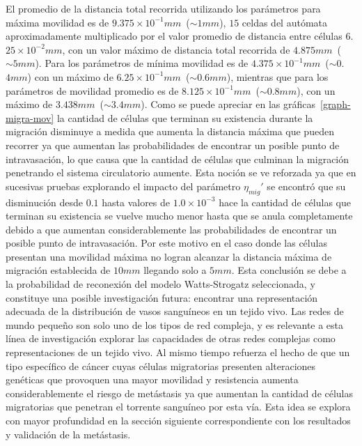 El promedio de la distancia total recorrida utilizando los par\'ametros para m\'axima movilidad es de $9$.$375 \times 10^{-1}mm$~($\sim 1mm$), $15$ celdas del aut\'omata aproximadamente multiplicado por el valor promedio de distancia entre c\'elulas $6$.$25 \times 10^{-2}mm$, con un valor m\'aximo de distancia total recorrida de $4$.$875mm$~($\sim 5mm$). Para los par\'ametros de m\'inima movilidad es de $4$.$375 \times 10^{-1}mm$~($\sim 0$.$4mm$) con un m\'aximo de $6$.$25 \times 10^{-1}mm$~($\sim 0$.$6mm$), mientras que para los par\'ametros de movilidad promedio es de $8$.$125 \times 10^{-1}mm$~($\sim 0$.$8mm$), con un m\'aximo de $3$.$438mm$~($\sim 3$.$4mm$). Como se puede apreciar en las gr\'aficas~\ref{graph-migra-mov} la cantidad de c\'elulas que terminan su existencia durante la migraci\'on disminuye a medida que aumenta la distancia m\'axima que pueden recorrer ya que aumentan las probabilidades de encontrar un posible punto de intravasaci\'on, lo que causa que la cantidad de c\'elulas que culminan la migraci\'on penetrando el sistema circulatorio aumente. Esta noci\'on se ve reforzada ya que en sucesivas pruebas explorando el impacto del par\'ametro $\eta_{mig}'$ se encontr\'o que su disminuci\'on desde $0$.$1$ hasta valores de $1$.$0 \times 10^{-3}$ hace la cantidad de c\'elulas que terminan su existencia se vuelve mucho menor hasta que se anula completamente debido a que aumentan considerablemente las probabilidades de encontrar un posible punto de intravasaci\'on. Por este motivo en el caso donde las c\'elulas presentan una movilidad m\'axima no logran alcanzar la distancia m\'axima de migraci\'on establecida de $10mm$ llegando solo a $5mm$. Esta conclusi\'on se debe a la probabilidad de reconexi\'on del modelo Watts-Strogatz seleccionada, y constituye una posible investigaci\'on futura: encontrar una representaci\'on adecuada de la distribuci\'on de vasos sangu\'ineos en un tejido vivo. Las redes de mundo peque\~no son solo uno de los tipos de red compleja, y es relevante a esta l\'inea de investigaci\'on explorar las capacidades de otras redes complejas como representaciones de un tejido vivo. Al mismo tiempo refuerza el hecho de que un tipo espec\'ifico de c\'ancer cuyas c\'elulas migratorias presenten alteraciones gen\'eticas que provoquen una mayor movilidad y resistencia aumenta considerablemente el riesgo de met\'astasis ya que aumentan la cantidad de c\'elulas migratorias que penetran el torrente sangu\'ineo por esta v\'ia. Esta idea se explora con mayor profundidad en la secci\'on siguiente correspondiente con los resultados y validaci\'on de la met\'astasis.

